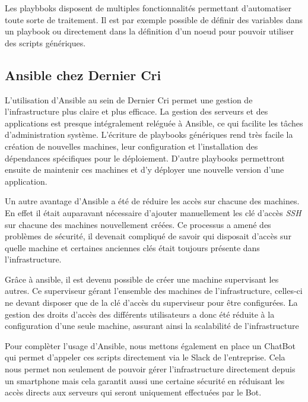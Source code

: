 \documentclass[11pt,a4paper]{article}
\begin{document}
  Les playbboks disposent de multiples fonctionnalités permettant
  d'automatiser toute sorte de traitement. Il est par exemple possible de
  définir des variables dans un playbook ou directement dans la définition
  d'un noeud pour pouvoir utiliser des scripts génériques.

  \newpage

  \subsection{Ansible chez Dernier Cri}\label{ansible-chez-dernier-cri}

  L'utilisation d'Ansible au sein de Dernier Cri permet une gestion de
  l'infrastructure plus claire et plus efficace. La gestion des serveurs
  et des applications est presque intégralement reléguée à Ansible, ce qui
  facilite les tâches d'administration système. L'écriture de playbooks
  génériques rend très facile la création de nouvelles machines, leur
  configuration et l'installation des dépendances spécifiques pour le
  déploiement. D'autre playbooks permettront ensuite de maintenir ces
  machines et d'y déployer une nouvelle version d'une application.

  \bigskip

  Un autre avantage d'Ansible a été de réduire les accès sur chacune des
  machines. En effet il était auparavant nécessaire d'ajouter manuellement
  les clé d'accès \emph{SSH} sur chacune des machines nouvellement créées.
  Ce processus a amené des problèmes de sécurité, il devenait compliqué de
  savoir qui disposait d'accès sur quelle machine et certaines anciennes
  clés était toujours présente dans l'infrastructure.

  \bigskip

  Grâce à ansible, il est devenu possible de créer une machine supervisant
  les autres. Ce superviseur gérant l'ensemble des machines de
  l'infrastructure, celles-ci ne devant disposer que de la clé d'accès du
  superviseur pour être configurées. La gestion des droits d'accès des
  différents utilisateurs a donc été réduite à la configuration d'une
  seule machine, assurant ainsi la scalabilité de l'infrastructure

  \bigskip

  Pour complèter l'usage d'Ansible, nous mettons également en place un
  ChatBot qui permet d'appeler ces scripts directement via le Slack de
  l'entreprise. Cela nous permet non seulement de pouvoir gérer
  l'infrastructure directement depuis un smartphone mais cela garantit
  aussi une certaine sécurité en réduisant les accès directs aux serveurs
  qui seront uniquement effectuées par le Bot.
\end{document}
